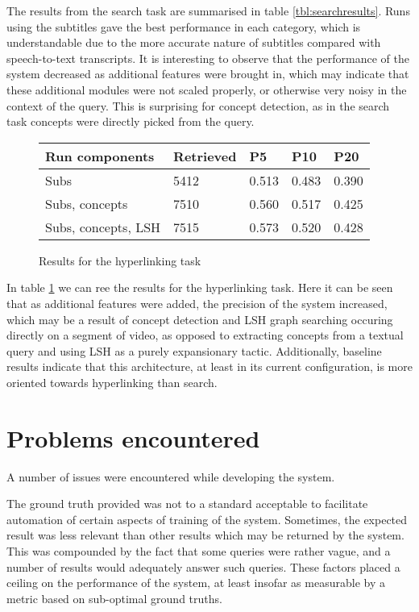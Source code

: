 \documentclass{../acm_proc_article-me11_tweaked}
\begin{document}

The results from the search task are summarised in table 
\ref{tbl:searchresults}. Runs using the subtitles gave the best performance in 
each category, which is understandable due to the more accurate nature of 
subtitles compared with speech-to-text transcripts. It is interesting to 
observe that the performance of the system decreased as additional features 
were brought in, which may indicate that these additional modules were not 
scaled properly, or otherwise very noisy in the context of the query. This is 
surprising for concept detection, as in the search task concepts were directly 
picked from the query.

\begin{figure}
\centering
\begin{tabu} to 1.1\linewidth {|l|X[2]|X|X|X|}
\hline
\textbf{Run components} & \textbf{Retrieved} & \textbf{P5} & \textbf{P10} &
\textbf{P20} \\
\hline
Subs & 5412 & 0.513 & 0.483 & 0.390 \\
Subs, concepts & 7510 & 0.560 & 0.517 & 0.425 \\
Subs, concepts, LSH & 7515 & 0.573 & 0.520 & 0.428 \\
\hline
\end{tabu}
\caption{Results for the hyperlinking task}
\label{tbl:hyperresults}
\end{figure}

In table \ref{tbl:hyperresults} we can ree the results for the hyperlinking 
task. Here it can be seen that as additional features were added, the 
precision of the system increased, which may be a result of concept detection 
and LSH graph searching occuring directly on a segment of video, as opposed to 
extracting concepts from a textual query and using LSH as a purely 
expansionary tactic. Additionally, baseline results indicate that this 
architecture, at least in its current configuration, is more oriented towards 
hyperlinking than search.

\section{Problems encountered}
A number of issues were encountered while developing the system.

The ground truth provided was not to a standard acceptable to facilitate 
automation of certain aspects of training of the system. Sometimes, the 
expected result was less relevant than other results which may be returned by 
the system. This was compounded by the fact that some queries were rather 
vague, and a number of results would adequately answer such queries. These 
factors placed a ceiling on the performance of the system, at least insofar as 
measurable by a metric based on sub-optimal ground truths.
\end{document}
